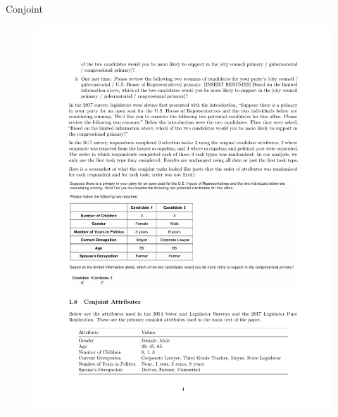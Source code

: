 \documentclass[
  ignorenonframetext,
]{beamer}
\begin{document}
\begin{frame}{Conjoint}
\protect\hypertarget{conjoint}{}
\begin{figure}

{\centering \includegraphics[width=0.9\linewidth]{./figs/survey-exp-teele-2018} 

}

\end{figure}

\begin{figure}


\end{figure}
\end{frame}
\end{document}
